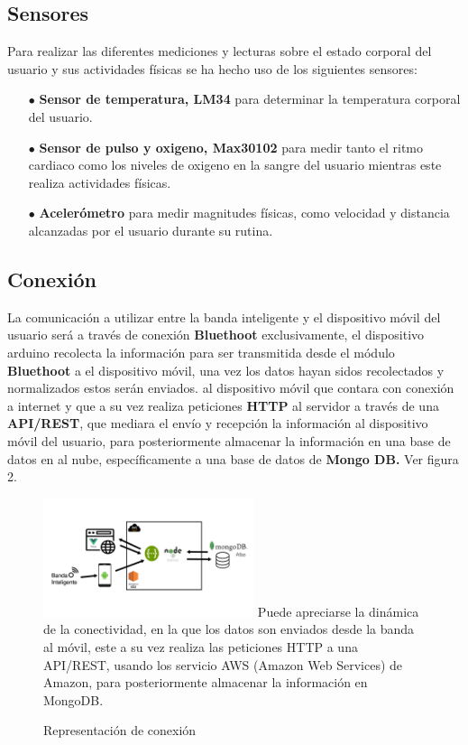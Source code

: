 \documentclass[osajnl,twocolumn,showpacs,superscriptaddress,10pt]{revtex4-1}
\begin{document}
\subsection{Sensores}
Para realizar las diferentes mediciones y lecturas sobre el estado corporal del usuario y sus actividades físicas se ha hecho uso de los siguientes sensores:
\begin{itemize}
    \item[$\bullet$]\textbf{Sensor de temperatura, LM34} para determinar la temperatura corporal del usuario.
    \item[$\bullet$]\textbf{Sensor de pulso y oxigeno, Max30102} para medir tanto el ritmo cardiaco como los niveles de oxigeno en la sangre del usuario mientras este realiza actividades físicas.
    \item[$\bullet$]\textbf{Acelerómetro} para medir magnitudes físicas, como velocidad y distancia alcanzadas por el usuario durante su rutina.
\end{itemize}
\subsection{Conexión}
    La comunicación a utilizar entre la banda inteligente y el dispositivo móvil del usuario será a través de conexión \textbf{Bluethoot} exclusivamente, el dispositivo arduino recolecta la información para ser transmitida desde el módulo \textbf{Bluethoot} a el dispositivo móvil, una vez los datos hayan sidos recolectados y normalizados estos serán enviados.  al dispositivo móvil que contara con conexión a internet y que a su vez realiza peticiones \textbf{HTTP} al servidor a través de una \textbf{API/REST}, que mediara el envío y recepción la información al dispositivo móvil del usuario, para posteriormente almacenar la información en una base de datos en al nube, específicamente a una base de datos de \textbf{Mongo DB.} Ver figura 2. \newline
\begin{figure} [H] \centering 
\caption{Representación de conexión}
\includegraphics[width=0.55\textwidth]{Arquitectura.png} 
Puede apreciarse la dinámica de la conectividad, en la que los datos son enviados desde la banda al móvil, este a su vez realiza las peticiones HTTP a una API/REST, usando los servicio AWS (Amazon Web Services) de Amazon, para posteriormente almacenar la información en MongoDB.
\end{figure}
\end{document}
